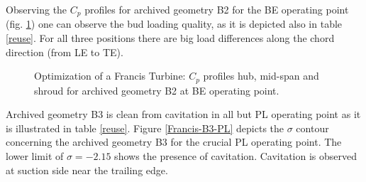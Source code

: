 Observing the $C_p$ profiles for archived geometry B2 for the BE operating point (fig. \ref{Francis-B2-LOAD}) one can observe the bud loading quality, as it is depicted also in table \ref{reuse}. For all three positions there are big load differences along the chord direction (from LE to TE). 

\begin{figure}[h!]
\begin{minipage}[b]{1\linewidth}
 \centering
\end{minipage}
\caption{Optimization of a Francis Turbine: $C_p$ profiles hub, mid-span and shroud for archived geometry B2 at BE operating point.}
\label{Francis-B2-LOAD}
\end{figure}

Archived geometry B3 is clean from cavitation in all but PL operating point as it is illustrated in table \ref{reuse}. Figure \ref{Francis-B3-PL} depicts the $\sigma$ contour concerning the archived geometry B3 for the crucial PL operating point. The lower limit of $\sigma = -2.15$ shows the presence of cavitation. Cavitation is observed at suction side near the trailing edge.     


